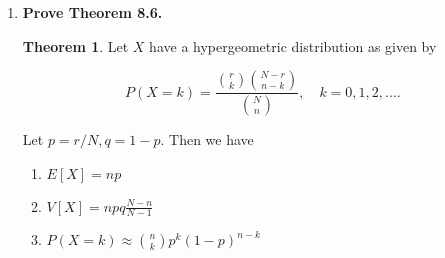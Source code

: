 \documentclass[10pt, oneside]{article}   	%
\theoremstyle{definition}
\newtheorem*{thm*}{Theorem}
\begin{document}
\begin{enumerate}[label=8.\arabic*]
\begin{proof}
\begin{align*}
P(X > t) &= \sum^{\infty}_{i = t+1} P(X = i) \\
&= \sum^{\infty}_{i = t+1} (1-p)^{i-1} p \\
&= 1 - \sum^t_{i=1} (1-p)^{i-1} p \\
&= 1 - p \Bigg( \frac{1 - (1-p)^t}{1 - (1-p)} \Bigg) \\
&= (1-p)^t
\end{align*}

And similarly for the left:

\begin{align*}
P(X > s + t | X > s) &= \frac{P(X > s + t, X > s)}{P(X > s)} \\
&= \frac{P(X > s + t)}{P(X > s)} \\
&= \frac{\sum^{\infty}_{i = s + t + 1} (1-p)^{i-1} p }{\sum^{\infty}_{i = s + 1} (1-p)^{i-1} p} \\
&= \frac{ 1 - \sum^{s+t}_{i = 1} (1-p)^{i-1} p}{ 1- \sum^s_{i = 1} (1-p)^{i-1} p } \\
&= \frac{1 - p \Big( \frac{1 - (1-p)^{s+t}}{1 - (1-p)} \Big) }{ 1 - p \Big( \frac{1-(1-p)^s}{1-(1-p)} \Big)} \\
&= \frac{(1-p)^{s+t}}{(1-p)^s} = (1-p)^t
\end{align*}

And so we can conclude that $\boxed{ P(X > s + t | X > s) = P(X > t) }$.
\end{proof}

\item  \begin{tcolorbox}[
  colback=Cerulean!5!white,
  colframe=Cerulean!75!black]
\textbf{Prove Theorem 8.6.}
\end{tcolorbox}

\begin{thm*}
Let $X$ have a hypergeometric distribution as given by

\[ P(X = k) = \frac{\binom{r}{k} \binom{N-r}{n-k} }{\binom{N}{n} }, \quad k = 0, 1, 2, .... \]

Let $p = r/N, q = 1 - p$. Then we have

\begin{enumerate}
\item $E[X] = np$
\item $V[X] = npq \frac{N-n}{N-1}$
\item $P(X = k) \approx \binom{n}{k} p^k (1-p)^{n-k}$
\end{enumerate}
\end{thm*}


\end{enumerate}
\end{document}
